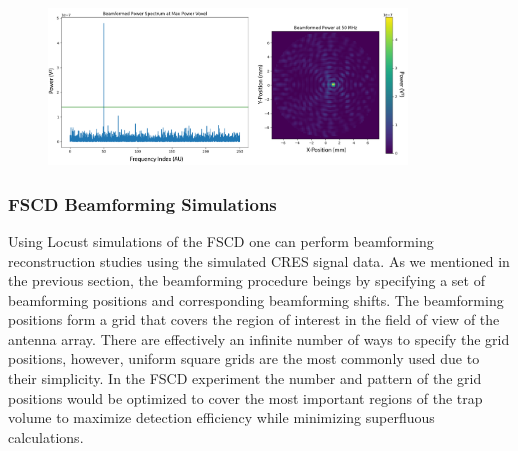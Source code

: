 \begin{figure}
    \centering
    \includegraphics*[width=0.85\textwidth]{figs/Chapter-4/230725_beamforming_example.png}
    \caption{}
\end{figure}


\subsubsection*{FSCD Beamforming Simulations}

Using Locust simulations of the FSCD one can perform beamforming reconstruction studies using the simulated CRES signal data. As we mentioned in the previous section, the beamforming procedure beings by specifying a set of beamforming positions and corresponding beamforming shifts. The beamforming positions form a grid that covers the region of interest in the field of view of the antenna array. There are effectively an infinite number of ways to specify the grid positions, however, uniform square grids are the most commonly used due to their simplicity. In the FSCD experiment the number and pattern of the grid positions would be optimized to cover the most important regions of the trap volume to maximize detection efficiency while minimizing superfluous calculations.

